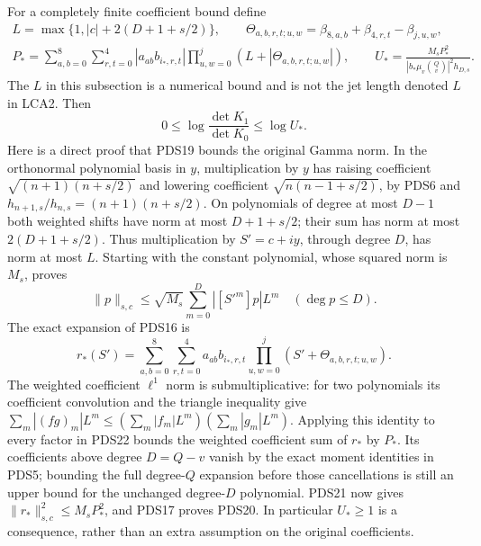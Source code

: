 \documentclass[10pt]{article}
\begin{document}
For a completely finite coefficient bound define
\[
\begin{gathered}
 L=\max\{1,|c|+2(D+1+s/2)\},\qquad
 \Theta_{a,b,r,t;u,w}
       =\beta_{8,a,b}+\beta_{4,r,t}-\beta_{j,u,w},\\
 P_*=
 \sum_{a,b=0}^8\sum_{r,t=0}^4|a_{ab}b_{i_*,r,t}|
          \prod_{u,w=0}^j(L+|\Theta_{a,b,r,t;u,w}|),\qquad
 U_*=
 \frac{M_s P_*^2}
 {|b_*\mu_v\binom Qv|^2h_{D,s}} .
\end{gathered}\tag{PDS19}
\]
The $L$ in this subsection is a numerical bound and is not the
jet length denoted $L$ in LCA2. Then
\[
 0\le\log\frac{\det K_1}{\det K_0}\le\log U_*.
\tag{PDS20}
\]
Here is a direct proof that PDS19 bounds the original Gamma norm.
In the orthonormal polynomial basis in $y$, multiplication by $y$
has raising coefficient $\sqrt{(n+1)(n+s/2)}$ and lowering
coefficient $\sqrt{n(n-1+s/2)}$, by PDS6 and
$h_{n+1,s}/h_{n,s}=(n+1)(n+s/2)$.
On polynomials of degree at most $D-1$ both weighted shifts
have norm at most $D+1+s/2$; their sum has norm at most
$2(D+1+s/2)$. Thus multiplication by $S'=c+iy$, through
degree $D$, has norm at most $L$. Starting with the constant
polynomial, whose squared norm is $M_s$, proves
\[
 \|p\|_{s,c}\le\sqrt{M_s}\sum_{m=0}^D|[S'^m]p|L^m
       \quad (\deg p\le D).
\tag{PDS21}
\]
The exact expansion of PDS16 is
\[
 r_*(S')=\sum_{a,b=0}^8\sum_{r,t=0}^4a_{ab}b_{i_*,r,t}
                  \prod_{u,w=0}^j(S'+\Theta_{a,b,r,t;u,w}).
\tag{PDS22}
\]
The weighted coefficient $\ell^1$ norm is submultiplicative:
for two polynomials its coefficient convolution and the triangle
inequality give $\sum_m|(fg)_m|L^m\le
(\sum_m|f_m|L^m)(\sum_m|g_m|L^m)$.
Applying this identity to every factor in PDS22 bounds the
weighted coefficient sum of $r_*$ by $P_*$. Its coefficients
above degree $D=Q-v$ vanish by the exact moment identities in
PDS5; bounding the full degree-$Q$ expansion before those
cancellations is still an upper bound for the unchanged
degree-$D$ polynomial. PDS21 now gives
$\|r_*\|_{s,c}^2\le M_sP_*^2$, and PDS17 proves PDS20.
In particular $U_*\ge1$ is a consequence, rather than an
extra assumption on the original coefficients.
\end{document}
